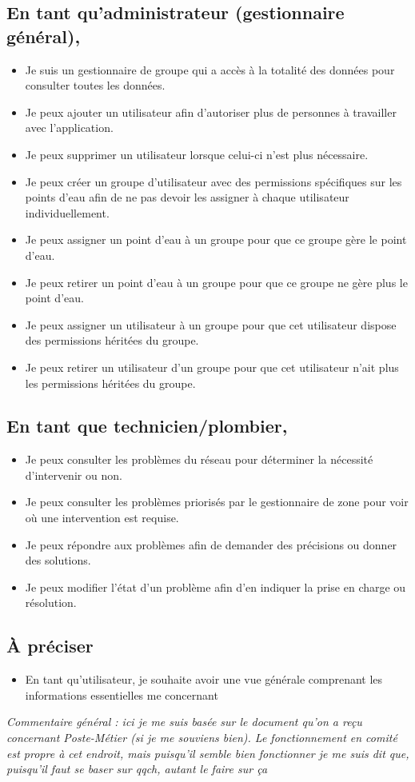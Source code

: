 \documentclass[a4paper, 11pt]{article}
\begin{document}
\subsection{En tant qu'administrateur (gestionnaire général),}
\begin{itemize}
  \item Je suis un gestionnaire de groupe qui a accès à la totalité des données pour consulter toutes les données.
  \item Je peux ajouter un utilisateur afin d'autoriser plus de personnes à travailler avec l'application.
  \item Je peux supprimer un utilisateur lorsque celui-ci n'est plus nécessaire.
  \item Je peux créer un groupe d'utilisateur avec des permissions spécifiques sur les points d'eau afin de ne pas devoir les assigner à chaque utilisateur individuellement.
  \item Je peux assigner un point d'eau à un groupe pour que ce groupe gère le point d'eau.
  \item Je peux retirer un point d'eau à un groupe pour que ce groupe ne gère plus le point d'eau.
  \item Je peux assigner un utilisateur à un groupe pour que cet utilisateur dispose des permissions héritées du groupe.
  \item Je peux retirer un utilisateur d'un groupe pour que cet utilisateur n'ait plus les permissions héritées du groupe.

\end{itemize}

\subsection{En tant que technicien/plombier,}
\begin{itemize}
  \item Je peux consulter les problèmes du réseau pour déterminer la nécessité d'intervenir ou non.
  \item Je peux consulter les problèmes priorisés par le gestionnaire de zone pour voir où une intervention est requise.
  \item Je peux répondre aux problèmes afin de demander des précisions ou donner des solutions.
  \item Je peux modifier l'état d'un problème afin d'en indiquer la prise en charge ou résolution.
\end{itemize}

\subsection{À préciser}
\begin{itemize}
  \item En tant qu'utilisateur, je souhaite avoir une vue générale comprenant les informations essentielles me concernant
\end{itemize}

\emph{Commentaire général : ici je me suis basée sur le document qu'on a reçu concernant Poste-Métier (si je me souviens bien). Le fonctionnement en comité est propre à cet endroit, mais puisqu'il semble bien fonctionner je me suis dit que, puisqu'il faut se baser sur qqch, autant le faire sur ça}
\end{document}
